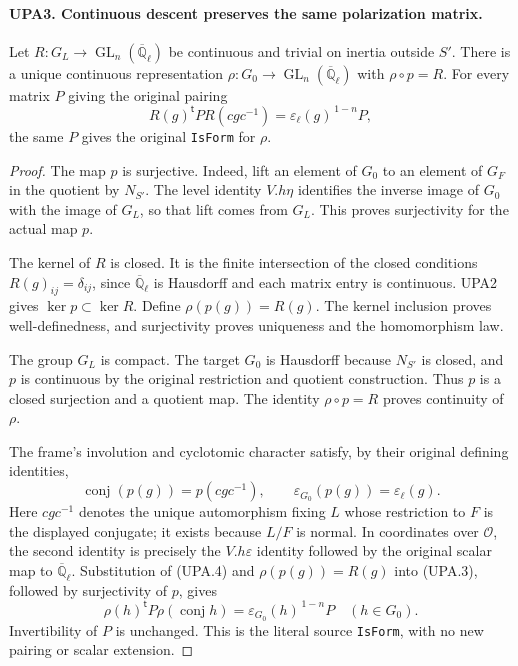 \documentclass[11pt,a4paper]{article}
\numberwithin{equation}{section}
\theoremstyle{remark}\newtheorem{remark}[theorem]{Remark}
\begin{document}
\paragraph{UPA3. Continuous descent preserves the same polarization matrix.}
\label{claim:UPA3}
Let $R:G_L\to\operatorname{GL}_n(\overline{\mathbb Q}_\ell)$
be continuous and trivial on inertia outside $S'$.
There is a unique continuous representation
$\rho:G_0\to\operatorname{GL}_n(\overline{\mathbb Q}_\ell)$
with $\rho\circ p=R$.
For every matrix $P$ giving the original pairing
\[
 R(g)^{\mathsf t}P R(cgc^{-1})
                =\varepsilon_\ell(g)^{\,1-n}P,
 \tag{UPA.3}
\]
the same $P$ gives the original \texttt{Is\allowbreak Form} for $\rho$.
\begin{proof}
The map $p$ is surjective.  Indeed, lift an element of $G_0$
to an element of $G_F$ in the quotient by $N_{S'}$.
The level identity $V.h\eta$ identifies the inverse image of
$G_0$ with the image of $G_L$, so that lift comes from $G_L$.
This proves surjectivity for the actual map $p$.

The kernel of $R$ is closed.  It is the finite intersection
of the closed conditions $R(g)_{ij}=\delta_{ij}$, since
$\overline{\mathbb Q}_\ell$ is Hausdorff and each matrix entry
is continuous.  UPA2 gives $\ker p\subset\ker R$.
Define $\rho(p(g))=R(g)$.  The kernel inclusion proves
well-definedness, and surjectivity proves uniqueness and the
homomorphism law.

The group $G_L$ is compact.  The target $G_0$ is Hausdorff
because $N_{S'}$ is closed, and $p$ is continuous by the
original restriction and quotient construction.  Thus $p$
is a closed surjection and a quotient map.  The identity
$\rho\circ p=R$ proves continuity of $\rho$.

The frame's involution and cyclotomic character satisfy,
by their original defining identities,
\[
 \operatorname{conj}(p(g))=p(cgc^{-1}),\qquad
 \varepsilon_{G_0}(p(g))=\varepsilon_\ell(g).
 \tag{UPA.4}
\]
Here $cgc^{-1}$ denotes the unique automorphism fixing $L$
whose restriction to $F$ is the displayed conjugate; it
exists because $L/F$ is normal.  In coordinates over
$\mathcal O$, the second identity is precisely the
$V.h\varepsilon$ identity followed by the original scalar
map to $\overline{\mathbb Q}_\ell$.
Substitution of (UPA.4) and $\rho(p(g))=R(g)$ into
(UPA.3), followed by surjectivity of $p$, gives
\[
 \rho(h)^{\mathsf t}P\rho(\operatorname{conj}h)
                   =\varepsilon_{G_0}(h)^{\,1-n}P
 \quad(h\in G_0).
 \tag{UPA.5}
\]
Invertibility of $P$ is unchanged.  This is the literal
source \texttt{Is\allowbreak Form}, with no new pairing or scalar extension.
\end{proof}
\end{document}
